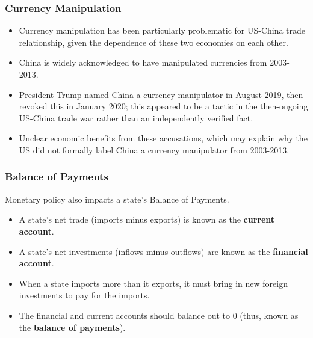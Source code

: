 \documentclass[handout]{beamer}
\begin{document}
\begin{frame} 
	\frametitle{\LARGE{Currency Manipulation}}
		\begin{itemize}
			\item Currency manipulation has been particularly problematic for US-China trade relationship, given the dependence of these two economies on each other. \pause 
			\item China is widely acknowledged to have manipulated currencies from 2003-2013. \pause 
			\item President Trump named China a currency manipulator in August 2019, then revoked this in January 2020; this appeared to be a tactic in the then-ongoing US-China trade war rather than an independently verified fact. \pause
			\item Unclear economic benefits from these accusations, which may explain why the US did not formally label China a currency manipulator from 2003-2013.
		\end{itemize}	
\end{frame}



\begin{frame} 
	\frametitle{\LARGE{Balance of Payments}}
	Monetary policy also impacts a state's Balance of Payments.
	\begin{itemize}
		\item A state's net trade (imports minus exports) is known as the \textbf{current account}. \pause
		\item A state's net investments (inflows minus outflows) are known as the \textbf{financial account}. \pause
		\item When a state imports more than it exports, it must bring in new foreign investments to pay for the imports. \pause 
		\item The financial and current accounts should balance out to 0 (thus, known as the \textbf{balance of payments}). 
	\end{itemize}
\end{frame}
\end{document}
